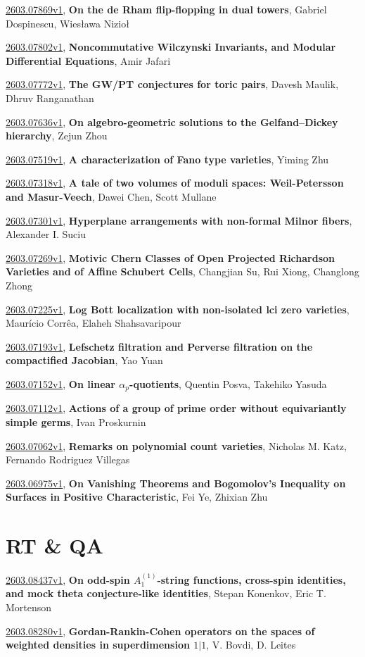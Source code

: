 \documentclass[9pt, a4paper]{article}
\theoremstyle{plain}
\theoremstyle{definition}
\theoremstyle{remark}
\newcommand{\arxiv}[3]{\href{https://arxiv.org/abs/#1}{#1}, \textbf{\textcolor{arxivblue}{#2}}, #3}
\begin{document}
\arxiv{2603.07869v1}{On the de Rham flip-flopping in dual towers}{Gabriel Dospinescu, Wiesława Nizioł}

\arxiv{2603.07802v1}{Noncommutative Wilczynski Invariants, and Modular Differential Equations}{Amir Jafari}

\arxiv{2603.07772v1}{The GW/PT conjectures for toric pairs}{Davesh Maulik, Dhruv Ranganathan}

\arxiv{2603.07636v1}{On algebro-geometric solutions to the Gelfand--Dickey hierarchy}{Zejun Zhou}

\arxiv{2603.07519v1}{A characterization of Fano type varieties}{Yiming Zhu}

\arxiv{2603.07318v1}{A tale of two volumes of moduli spaces: Weil-Petersson and Masur-Veech}{Dawei Chen, Scott Mullane}

\arxiv{2603.07301v1}{Hyperplane arrangements with non-formal Milnor fibers}{Alexander I. Suciu}

\arxiv{2603.07269v1}{Motivic Chern Classes of Open Projected Richardson Varieties and of Affine Schubert Cells}{Changjian Su, Rui Xiong, Changlong Zhong}

\arxiv{2603.07225v1}{Log Bott localization with non-isolated lci zero varieties}{Maurício Corrêa, Elaheh Shahsavaripour}

\arxiv{2603.07193v1}{Lefschetz filtration and Perverse filtration on the compactified Jacobian}{Yao Yuan}

\arxiv{2603.07152v1}{On linear $α_p$-quotients}{Quentin Posva, Takehiko Yasuda}

\arxiv{2603.07112v1}{Actions of a group of prime order without equivariantly simple germs}{Ivan Proskurnin}

\arxiv{2603.07062v1}{Remarks on polynomial count varieties}{Nicholas M. Katz, Fernando Rodriguez Villegas}

\arxiv{2603.06975v1}{On Vanishing Theorems and Bogomolov's Inequality on Surfaces in Positive Characteristic}{Fei Ye, Zhixian Zhu}


\section{RT \& QA}
\arxiv{2603.08437v1}{On odd-spin $A_{1}^{(1)}$-string functions, cross-spin identities, and mock theta conjecture-like identities}{Stepan Konenkov, Eric T. Mortenson}

\arxiv{2603.08280v1}{Gordan-Rankin-Cohen operators on the spaces of weighted densities in superdimension $1\vert 1$}{V. Bovdi, D. Leites}
\end{document}
